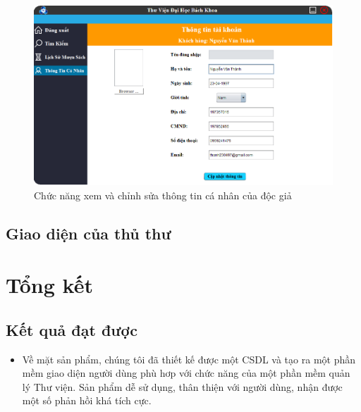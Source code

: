 \documentclass[12pt]{report}
\begin{document}
						\begin{figure}
						\centering
						\includegraphics[scale=0.65]{images/inforreader.png}
						\caption{Chức năng xem và chỉnh sửa thông tin cá nhân của độc giả}
						\label{fig:readerinfor}
						\end{figure}
			\section{Giao diện của thủ thư}
	\chapter{Tổng kết}
		\section{Kết quả đạt được}
			\begin{itemize}
				\item Về mặt sản phẩm, chúng tôi đã thiết kế được một CSDL và tạo ra một phần mềm giao diện người dùng phù hơp với chức năng của một phần mềm quản lý Thư viện. Sản phẩm dễ sử dụng, thân thiện với người dùng, nhận được một số phản hồi khá tích cực.
			\end{itemize}
\end{document}
